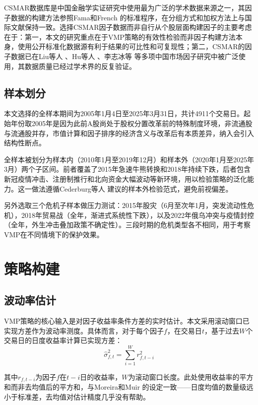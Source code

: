 \documentclass[
    decl-page,
    oneside,
  ]{njuthesis}
\begin{document}
CSMAR数据库是中国金融学实证研究中使用最为广泛的学术数据来源之一，其因子数据的构建方法参照Fama和French \cite{fama2015five} 的标准程序，在分组方式和加权方法上与国际文献保持一致。选择CSMAR因子数据而非自行从个股层面构建因子的主要考虑在于：第一，本文的研究重点在于VMP策略的有效性检验而非因子构建方法本身，使用公开标准化数据源有利于结果的可比性和可复现性；第二，CSMAR的因子数据已在Liu等人 \cite{liu2019size}、Hu等人 \cite{hu2019chinese}、李志冰等 \cite{li2017factor} 等多项中国市场因子研究中被广泛使用，其数据质量已经过学术界的反复验证。

\subsection{样本划分}

本文选择的全样本期间为2005年1月4日至2025年3月31日，共计4911个交易日。起始年份取2005年是因为此前A股尚处于股权分置改革前的特殊制度环境，非流通股与流通股并存，市值计算和因子排序的经济含义与改革后有本质差异，纳入会引入结构性断点。

全样本被划分为样本内（2010年1月至2019年12月）和样本外（2020年1月至2025年3月）两个子区间。前者覆盖了2015年急速牛熊转换和2018年持续下跌，后者包含新冠疫情冲击、注册制推行和北向资金大幅波动等新环境，用以检验策略的泛化能力。这一做法遵循Cederburg等人 \cite{cederburg2020performance} 建议的样本外检验范式，避免前视偏差。

另外选取三个危机子样本做压力测试：2015年股灾（6月至次年1月，突发流动性危机），2018年贸易战（全年，渐进式系统性下跌），以及2022年俄乌冲突与疫情封控（全年，外生冲击叠加政策不确定性）。三段时期的危机类型各不相同，用于考察VMP在不同情境下的保护效果。

\section{策略构建}

\subsection{波动率估计}

VMP策略的核心输入是对因子收益率条件方差的实时估计。本文采用滚动窗口已实现方差作为波动率测度。具体而言，对于每个因子$f$，在交易日$t$，基于过去$W$个交易日的日度收益率计算已实现方差：
\begin{equation}
  \hat{\sigma}_{f,t}^{2} = \sum_{i=1}^{W} r_{f,t-i}^{2}
  \label{eq:rv}
\end{equation}

其中$r_{f,t-i}$为因子$f$在$t-i$日的收益率，$W$为滚动窗口长度。此处使用收益率的平方和而非去均值后的平方和，与Moreira和Muir \cite{moreira2017volatility} 的设定一致——日度均值的数量级远小于标准差，去均值对估计精度几乎没有帮助。
\end{document}
